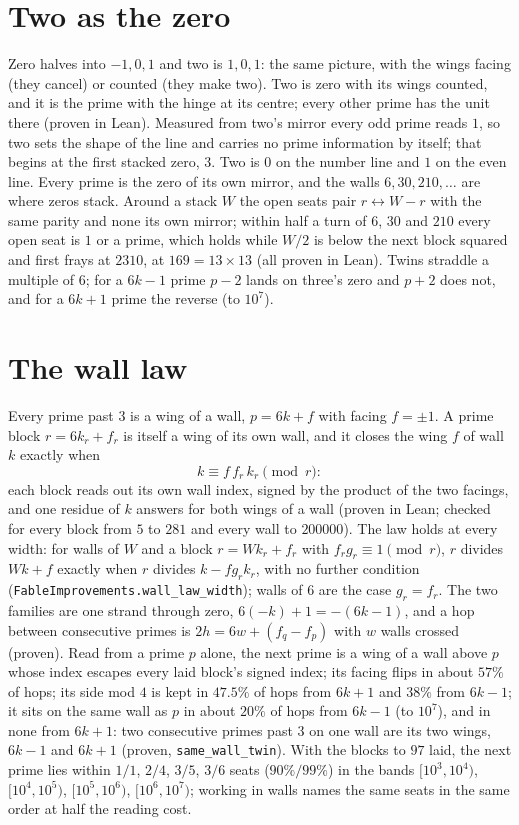 \documentclass[11pt]{article}
\begin{document}
\section{Two as the zero}
Zero halves into $-1,0,1$ and two is $1,0,1$: the same picture, with the wings facing (they cancel) or counted (they make two). Two is zero with its wings counted, and it is the prime with the hinge at its centre; every other prime has the unit there (proven in Lean). Measured from two's mirror every odd prime reads $1$, so two sets the shape of the line and carries no prime information by itself; that begins at the first stacked zero, $3$. Two is $0$ on the number line and $1$ on the even line. Every prime is the zero of its own mirror, and the walls $6, 30, 210, \dots$ are where zeros stack. Around a stack $W$ the open seats pair $r\leftrightarrow W-r$ with the same parity and none its own mirror; within half a turn of $6$, $30$ and $210$ every open seat is $1$ or a prime, which holds while $W/2$ is below the next block squared and first frays at $2310$, at $169 = 13\times13$ (all proven in Lean). Twins straddle a multiple of $6$; for a $6k-1$ prime $p-2$ lands on three's zero and $p+2$ does not, and for a $6k+1$ prime the reverse (to $10^7$).

\section{The wall law}
Every prime past $3$ is a wing of a wall, $p = 6k+f$ with facing $f = \pm1$. A prime block $r = 6k_r + f_r$ is itself a wing of its own wall, and it closes the wing $f$ of wall $k$ exactly when
\[ k \equiv f\, f_r\, k_r \pmod r: \]
each block reads out its own wall index, signed by the product of the two facings, and one residue of $k$ answers for both wings of a wall (proven in Lean; checked for every block from $5$ to $281$ and every wall to $200000$). The law holds at every width: for walls of $W$ and a block $r = W k_r + f_r$ with $f_r g_r \equiv 1 \pmod r$, $r$ divides $Wk+f$ exactly when $r$ divides $k - f g_r k_r$, with no further condition (\texttt{FableImprovements.wall\_law\_width}); walls of $6$ are the case $g_r = f_r$. The two families are one strand through zero, $6(-k)+1 = -(6k-1)$, and a hop between consecutive primes is $2h = 6w + (f_q - f_p)$ with $w$ walls crossed (proven). Read from a prime $p$ alone, the next prime is a wing of a wall above $p$ whose index escapes every laid block's signed index; its facing flips in about $57\%$ of hops; its side mod $4$ is kept in $47.5\%$ of hops from $6k+1$ and $38\%$ from $6k-1$; it sits on the same wall as $p$ in about $20\%$ of hops from $6k-1$ (to $10^7$), and in none from $6k+1$: two consecutive primes past $3$ on one wall are its two wings, $6k-1$ and $6k+1$ (proven, \texttt{same\_wall\_twin}). With the blocks to $97$ laid, the next prime lies within $1/1$, $2/4$, $3/5$, $3/6$ seats ($90\%/99\%$) in the bands $[10^3,10^4)$, $[10^4,10^5)$, $[10^5,10^6)$, $[10^6,10^7)$; working in walls names the same seats in the same order at half the reading cost.
\end{document}
